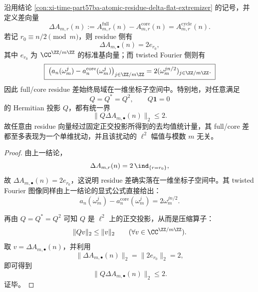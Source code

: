 \begin{conclusion}\label{con:xi-time-part57ba-core-full-residue-rankone-perturbation}
沿用结论 \ref{con:xi-time-part57ba-atomic-residue-delta-flat-extremizer} 的记号，并定义差向量
\[
\Delta A_{m,r}(n)
:=
A_{m,r}^{\mathrm{full}}(n)-A_{m,r}^{\mathrm{core}}(n)
=
A_{m,r}^{\mathrm{cycle}}(n).
\]
若记 \(r_0\equiv n/2\pmod m\)，则 residue 侧有
\[
\boxed{\;
\Delta A_{m,\bullet}(n)=2e_{r_0},\;}
\]
其中 \(e_{r_0}\) 为 \(\CC^{\ZZ/m\ZZ}\) 的标准基向量；而 twisted Fourier 侧则有
\[
\boxed{\;
\bigl(a_n(\omega_m^j)-a_n^{\mathrm{core}}(\omega_m^j)\bigr)_{j\in\ZZ/m\ZZ}
=
2(\omega_m^{j n/2})_{j\in\ZZ/m\ZZ}.\;}
\]
因此 full/core residue 差始终局域在一维坐标子空间中。特别地，对任意满足
\[
Q=Q^*=Q^2,
\qquad
Q\mathbf 1=0
\]
的 Hermitian 投影 \(Q\)，都有统一界
\[
\boxed{\;
\|Q\Delta A_{m,\bullet}(n)\|_2\le 2.\;}
\]
故任意由 residue 向量经过固定正交投影所得到的去均值统计量，其 full/core 差都至多表现为一个单维扰动，并且该扰动的 \(\ell^2\) 幅值与模数 \(m\) 无关。
\end{conclusion}
\begin{proof}
由上一结论，
\[
\Delta A_{m,r}(n)=2\,\ind_{\{r=r_0\}},
\]
故 \(\Delta A_{m,\bullet}(n)=2e_{r_0}\)，这说明 residue 差确实落在一维坐标子空间中。其 twisted Fourier 图像同样由上一结论的显式公式直接给出：
\[
a_n(\omega_m^j)-a_n^{\mathrm{core}}(\omega_m^j)=2\omega_m^{j n/2}.
\]

再由 \(Q=Q^*=Q^2\) 可知 \(Q\) 是 \(\ell^2\) 上的正交投影，从而是压缩算子：
\[
\|Qv\|_2\le \|v\|_2
\qquad(\forall v\in\CC^{\ZZ/m\ZZ}).
\]
取 \(v=\Delta A_{m,\bullet}(n)\)，并利用
\[
\|\Delta A_{m,\bullet}(n)\|_2=\|2e_{r_0}\|_2=2,
\]
即可得到
\[
\|Q\Delta A_{m,\bullet}(n)\|_2\le 2.
\]
证毕。
\end{proof}

\endinput
